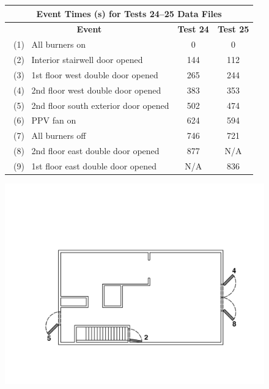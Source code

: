 \documentclass[12pt,oneside]{book}
\begin{document}
\begin{figure}[!ht]
\begin{minipage}[b]{0.8\columnwidth}
	\begin{flushleft}
	\begin{tabular}{lcc}
	\multicolumn{3}{c}{Event Times (s) for Tests 24--25 Data Files} \\
	\toprule
	\multicolumn{1}{c}{\textbf{Event}} 			& \textbf{Test 24}	& \textbf{Test 25} \\
	\midrule
	~(1)~ All burners on 						&   0		  		&	 0			\\
	~(2)~ Interior stairwell door opened 		&   144		  		&    112		\\
	~(3)~ 1st floor west double door opened 	&	265		  		&    244 	 	\\
	~(4)~ 2nd floor west double door opened 	&   383			  	&    353		\\
	~(5)~ 2nd floor south exterior door opened	&   502			  	&    474		\\
	~(6)~ PPV fan on 							&   624			  	&    594 		\\
	~(7)~ All burners off 						&   746 		  	&    721		\\
	~(8)~ 2nd floor east double door opened 	&   877			  	&    N/A		\\
	~(9)~ 1st floor east double door opened		& 	N/A 			& 	 836		\\
	\bottomrule
	\end{tabular}
	\end{flushleft}
\end{minipage}
\begin{minipage}[b]{0.9\columnwidth}
	\vspace{15pt}
	\centering
	\includegraphics[width=\columnwidth]{../Figures/Floor_Plans/West_Structure_2nd_Floor_Test_24}

\end{minipage}
\end{figure}
\end{document}
